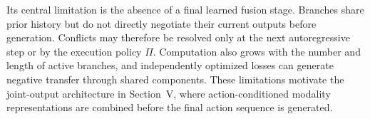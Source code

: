 Its central limitation is the absence of a final learned fusion stage. Branches share prior history but do not directly negotiate their current outputs before generation. Conflicts may therefore be resolved only at the next autoregressive step or by the execution policy $\Pi$. Computation also grows with the number and length of active branches, and independently optimized losses can generate negative transfer through shared components. These limitations motivate the joint-output architecture in Section~V, where action-conditioned modality representations are combined before the final action sequence is generated.

